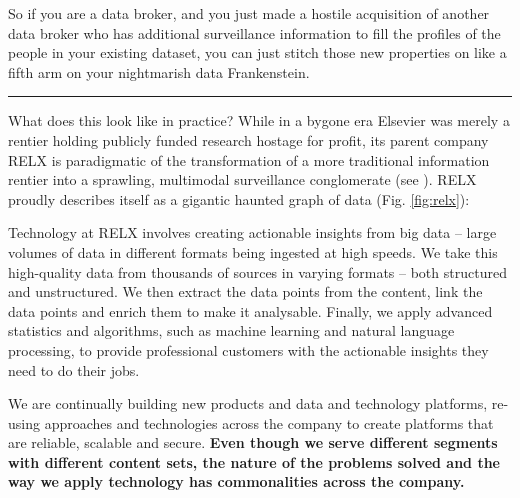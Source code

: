 \documentclass{article}
\renewenvironment{leftbar}
{\vspace{6pt}\def\FrameCommand{\hspace{0em}\vrule width 0.5pt \hspace{1em}}\MakeFramed {\advance\hsize-\width \FrameRestore}}
{\endMakeFramed}
\begin{document}
So if you are a data broker, and you just made a hostile acquisition of
another data broker who has additional surveillance information to fill
the profiles of the people in your existing dataset, you can just stitch
those new properties on like a fifth arm on your nightmarish data
Frankenstein.

\begin{center}\rule{0.5\linewidth}{0.5pt}\end{center}

What does this look like in practice? While in a bygone era Elsevier was
merely a rentier holding publicly funded research hostage for profit,
its parent company RELX is paradigmatic of the transformation of a more
traditional information rentier into a sprawling, multimodal
surveillance conglomerate (see \cite{lamdanDataCartelsCompanies2023} ). RELX proudly describes itself as a gigantic haunted graph of
data (Fig. \ref{fig:relx}):

\begin{leftbar}
Technology at RELX involves creating actionable insights from big data
-- large volumes of data in different formats being ingested at high
speeds. We take this high-quality data from thousands of sources in
varying formats -- both structured and unstructured. We then extract the
data points from the content, link the data points and enrich them to
make it analysable. Finally, we apply advanced statistics and
algorithms, such as machine learning and natural language processing, to
provide professional customers with the actionable insights they need to
do their jobs.

We are continually building new products and data and technology
platforms, re-using approaches and technologies across the company to
create platforms that are reliable, scalable and secure. \textbf{Even
though we serve different segments with different content sets, the
nature of the problems solved and the way we apply technology has
commonalities across the company.} \cite{relxAnnualReport20222023} 
\end{leftbar}
\end{document}

